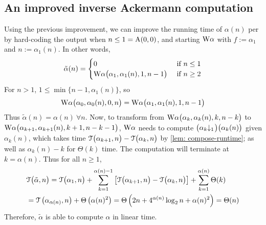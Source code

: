 \subsection{An improved inverse Ackermann computation}
Using the previous improvement, we can improve the running time of $\alpha(n)$ per  by hard-coding the output when $n\le 1 = \text{A}(0, 0)$, and starting $\text{W}\alpha$ with $f := \alpha_1$ and $n := \alpha_1(n)$. In other words,
\begin{equation*}
\tilde{\alpha}(n) = \begin{cases}
0 & \text{ if } n \le 1 \\ \text{W}\alpha\big(\alpha_1, \alpha_1(n), 1, n-1\big) & \text{ if } n \ge 2
\end{cases}
\end{equation*}
For $n > 1$, $1\le \min\big\{n-1, \alpha_1(n)\big\}$, so
\begin{equation*}
\text{W}\alpha\big(\alpha_0, \alpha_0(n), 0, n\big) =
\text{W}\alpha\big(\alpha_1, \alpha_1(n), 1, n-1\big)
\end{equation*}
Thus $\tilde{\alpha}(n) = \alpha(n) \ \forall n$. Now, to transform from $\text{W}\alpha\big(\alpha_k, \alpha_k(n), k, n-k\big)$ to $\text{W}\alpha\big(\alpha_{k+1}, \alpha_{k+1}(n), k+1, n-k-1\big)$, $\text{W}\alpha$ needs to compute $\big(\cdt{\alpha_k}{1}\big)\big(\alpha_k(n)\big)$ given $\alpha_k(n)$, which takes time $\mathcal{T}\big(\alpha_{k+1}, n\big) - \mathcal{T}\big(\alpha_k, n\big)$ by \cref{lem: compose-runtime}; as well as $\alpha_k(n) - k$ for $\Theta(k)$ time. The computation will terminate at $k = \alpha(n)$. Thus for all $n\ge 1$,
\begin{equation*}
\begin{aligned}
& \mathcal{T}\big(\tilde{\alpha}, n\big) = \mathcal{T}\big(\alpha_1, n\big) + \sum_{k=1}^{\alpha(n) - 1}
\left[ \mathcal{T}\big(\alpha_{k+1}, n\big) - \mathcal{T}\big(\alpha_k, n\big)
\right] + \sum_{k=1}^{\alpha(n)}\Theta(k) \\
& = \mathcal{T}\left(\alpha_{\alpha(n)}, n\right) + \Theta\left(\alpha(n)^2\right)
= \Theta\left(2n + 4^{\alpha(n)}\log_2n + \alpha(n)^2\right) = \Theta(n)
\end{aligned}
\end{equation*}
Therefore, $\tilde{\alpha}$ is able to compute $\alpha$ in linear time.
